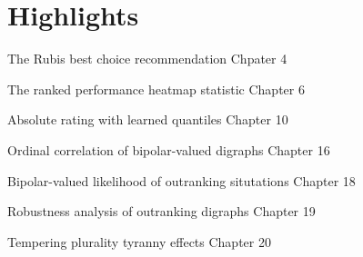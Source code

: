\section{Highlights}
\label{asec:0.1}

The Rubis best choice recommendation Chpater 4

The ranked performance heatmap statistic Chapter 6

Absolute rating with learned quantiles Chapter 10

Ordinal correlation of bipolar-valued digraphs Chapter 16

Bipolar-valued likelihood of outranking situtations Chapter 18

Robustness analysis of outranking digraphs Chapter 19

Tempering plurality tyranny effects Chapter 20

\clearpage


